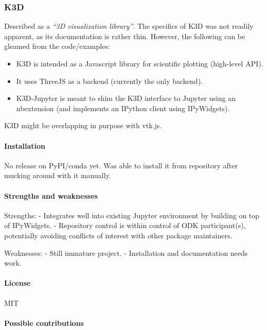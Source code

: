 \subsubsection{K3D}

Described as a \emph{``3D visualization library''}. The specifics of K3D
was not readily apparent, as its documentation is rather thin. However,
the following can be gleamed from the code/examples:

\begin{itemize}
\tightlist
\item
  K3D is intended as a Javascript library for scientific plotting
  (high-level API).
\item
  It uses ThreeJS as a backend (currently the only backend).
\item
  K3D-Jupyter is meant to shim the K3D interface to Jupyter using an
  nbextension (and implements an IPython client using IPyWidgets).
\end{itemize}

K3D might be overlapping in purpose with vtk.js.

\paragraph{Installation}

No release on PyPI/conda yet. Was able to install it from repository
after mucking around with it manually.

\paragraph{Strengths and weaknesses}

Strengths: - Integrates well into existing Jupyter environment by
building on top of IPyWidgets. - Repository control is within control of
ODK participant(s), potentially avoiding conflicts of interest with
other package maintainers.

Weaknesses: - Still immature project. - Installation and documentation
needs work.

\paragraph{License}

MIT

\paragraph{Possible contributions}

